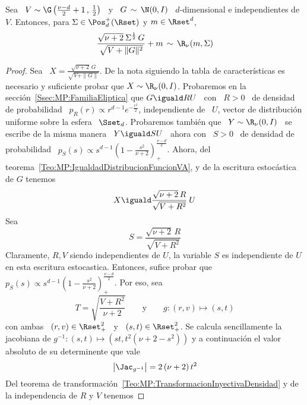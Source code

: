 %
\begin{lema}\label{Lem:MP:StudentRGamma}
%
  Sea \ $V \sim \G\left( \frac{\nu-d}{2}+1 \,  , \, \frac12 \right)$ \ y \ $G \,
  \sim \,  \N(0,I)$ \  $d$-dimensional e independientes  de $V$.  Entonces, para
  $\Sigma \in \Pos_d^+(\Rset)$ y $m \in \Rset^d$,
  \[
  \frac{\sqrt{\nu+2} \:  \Sigma^{\frac12} \, G}{\sqrt{V  + \|G\|^2}} + m \,  \sim \,
  \R_\nu( m , \Sigma )
  \]
\end{lema}
\begin{proof}
  Sea \ $X = \frac{\sqrt{\nu+2} \,  G}{\sqrt{V + \|G\|}}$.  De la nota siguiendo
  la tabla  de caracter\'isticas  es necesario y  suficiente probar que  $X \sim
  \R_\nu(0,I)$.  Probaremos en la secci\'on~\ref{Ssec:MP:FamiliaEliptica} que $G
  \iguald R U$  \ con \ $R >  0$ \ de densidad de probabilidad  \ $p_R(r) \propto
  r^{d-1} e^{-\frac{r^2}{2}}$, independiente de  \ $U$, vector de distribuci\'on
  uniforme  sobre la esfera  \ $\Sset_d$.   Probaremos tambi\'en  que \  $Y \sim
  \R_\nu(0,I)$ \ se escribe de la misma manera \ $Y \iguald S U$ \ ahora con \ $S
  >  0$ \  de densidad  de probabilidad  \ $p_S(s)  \propto s^{d-1}  \left(  1 -
    \frac{s^2}{\nu+2}       \right)_+^{\frac{\nu-d}{2}}$.        Ahora,      del
  teorema~\ref{Teo:MP:IgualdadDistribucionFuncionVA},   y    de   la   escritura
  estoc\'astica de $G$ tenemos
  \[
  X \iguald \frac{\sqrt{\nu+2} \, R}{\sqrt{V + R^2}} \: U
  \]
  Sea
  \[
  S = \frac{\sqrt{\nu+2} \, R}{\sqrt{V + R^2}}
  \]
  Claramente,  $R,  V$  siendo  independientes   de  $U$,  la  variable  $S$  es
  independiente de  $U$ en esta  escritura estocastica. Entonces,  sufice probar
  que    $p_S(s)    \propto     s^{d-1}    \left(    1    -    \frac{s^2}{\nu+2}
  \right)_+^{\frac{\nu-d}{2}}$. Por eso, sea
  \[
  T = \sqrt{\frac{V+R^2}{\nu+2}} \qquad \mbox{y} \qquad g: (r,v) \mapsto (s,t)
  \]
  con ambas  \ $(r,v) \in  \Rset_+^2$ \ y  \ $(s,t) \in \Rset_+^2$.   Se calcula
  sencillamente  la  jacobiana  de $g^{-1}:  (s,t)  \mapsto  \left(  s t  ,  t^2
    (\nu+2-s^2) \right)$ y a continuaci\'on el valor absoluto de su determinente
  que vale
  \[
  \left| \Jac_{g^{-1}} \right| = 2 \, (\nu+2) \, t^2
  \]
  Del teorema de transformaci\'on~\ref{Teo:MP:TransformacionInyectivaDensidad} y
  de la independencia de $R$ y $V$ tenemos

\end{proof}
